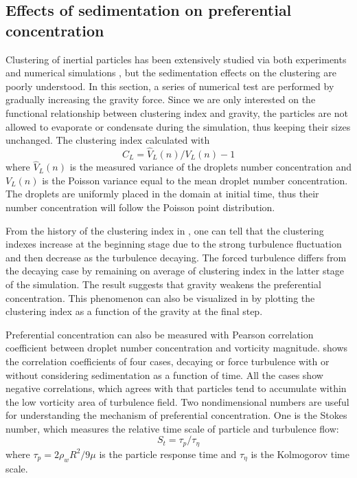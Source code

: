 \documentclass[draft,jgrga]{AGUTeX}
\begin{document}
\begin{article}
\section{Effects of sedimentation on preferential concentration }\label{sedimentation}
Clustering of inertial particles has been extensively studied via both 
experiments and numerical simulations \cite{Sundaram97, Reade2000}, but the sedimentation effects on the clustering are poorly understood. In this section, a series of numerical test are performed by gradually increasing the gravity force. Since we are only interested on the functional relationship between clustering index and gravity, the particles are not allowed to evaporate or condensate during the simulation, thus keeping their sizes unchanged.  The clustering index calculated with \cite{Vaillancourt02}
\begin{equation}
C_L = \hat{V}_L(n)/V_L(n)-1
\label{eq:cluster_index}
\end{equation}
where $\hat{V}_L(n)$ is the measured variance of the droplets number concentration and $V_L(n)$ is the Poisson variance equal to the mean droplet number concentration. The droplets are uniformly placed in the domain at initial time, thus their number concentration will follow the Poisson point distribution.

From the history of the clustering index in , one can tell that the clustering indexes increase at the beginning stage due to the strong turbulence fluctuation and then decrease as the turbulence decaying. The forced turbulence differs from the decaying case by remaining on average of clustering index in the latter stage of the simulation. The result suggests that gravity weakens the preferential concentration. This phenomenon can also be visualized in  by plotting the clustering index as a function of the gravity at the final step. 

Preferential concentration can also be measured with Pearson correlation coefficient between droplet number concentration and vorticity magnitude.  shows the correlation coefficients of four cases, decaying or force turbulence with or without considering sedimentation as a function of time. All the cases show negative correlations, which agrees with that particles tend to accumulate within the low vorticity area of turbulence field. Two nondimensional numbers are useful for understanding the mechanism of preferential concentration. One is the Stokes number, which measures the relative time scale of particle and turbulence flow:
\begin{equation}
S_t = \tau_p/\tau_{\eta}
\end{equation}
where $\tau_p = 2\rho_wR^2/9\mu$ is the particle response time and $\tau_{\eta}$ is the Kolmogorov time scale. 


\end{article}
\end{document}
